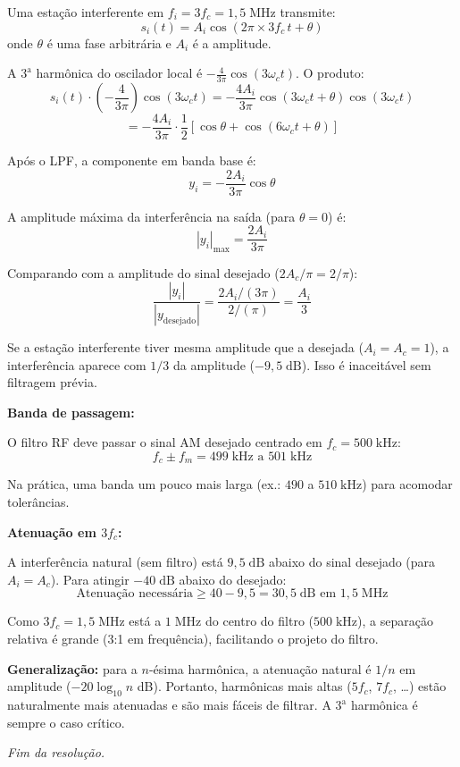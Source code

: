 \documentclass[11pt,a4paper]{article}
\begin{document}
\begin{resolucao}

Uma estação interferente em $f_i = 3f_c = 1{,}5\;\text{MHz}$ transmite:
\[
  s_i(t) = A_i\cos(2\pi \times 3f_c\,t + \theta)
\]
onde $\theta$ é uma fase arbitrária e $A_i$ é a amplitude.

A $3^{\text{a}}$ harmônica do oscilador local é $-\frac{4}{3\pi}\cos(3\omega_c t)$. O produto:
\[
  s_i(t) \cdot \left(-\frac{4}{3\pi}\right)\cos(3\omega_c t) = -\frac{4A_i}{3\pi}\cos(3\omega_c t + \theta)\cos(3\omega_c t)
\]
\[
  = -\frac{4A_i}{3\pi} \cdot \frac{1}{2}[\cos\theta + \cos(6\omega_c t + \theta)]
\]

Após o LPF, a componente em banda base é:
\[
  y_i = -\frac{2A_i}{3\pi}\cos\theta
\]

A amplitude máxima da interferência na saída (para $\theta = 0$) é:
\[
  |y_i|_{\max} = \frac{2A_i}{3\pi}
\]

Comparando com a amplitude do sinal desejado ($2A_c/\pi = 2/\pi$):
\[
  \boxed{\frac{|y_i|}{|y_{\text{desejado}}|} = \frac{2A_i/(3\pi)}{2/({\pi})} = \frac{A_i}{3}}
\]

Se a estação interferente tiver mesma amplitude que a desejada ($A_i = A_c = 1$), a interferência aparece com $1/3$ da amplitude ($-9{,}5\;\text{dB}$). Isso é inaceitável sem filtragem prévia.
\end{resolucao}

\begin{resolucao}

\textbf{Banda de passagem:}

O filtro RF deve passar o sinal AM desejado centrado em $f_c = 500\;\text{kHz}$:
\[
  \boxed{f_c \pm f_m = 499\;\text{kHz a } 501\;\text{kHz}}
\]

Na prática, uma banda um pouco mais larga (ex.: $490$ a $510\;\text{kHz}$) para acomodar tolerâncias.

\textbf{Atenuação em $3f_c$:}

A interferência natural (sem filtro) está $9{,}5\;\text{dB}$ abaixo do sinal desejado (para $A_i = A_c$). Para atingir $-40\;\text{dB}$ abaixo do desejado:
\[
  \text{Atenuação necessária} \geq 40 - 9{,}5 = \boxed{30{,}5\;\text{dB em } 1{,}5\;\text{MHz}}
\]

Como $3f_c = 1{,}5\;\text{MHz}$ está a $1\;\text{MHz}$ do centro do filtro ($500\;\text{kHz}$), a separação relativa é grande (3:1 em frequência), facilitando o projeto do filtro.

\textbf{Generalização:} para a $n$-ésima harmônica, a atenuação natural é $1/n$ em amplitude ($-20\log_{10} n$ dB). Portanto, harmônicas mais altas ($5f_c$, $7f_c$, \ldots) estão naturalmente mais atenuadas e são mais fáceis de filtrar. A $3^{\text{a}}$ harmônica é sempre o caso crítico.
\end{resolucao}

\vfill
\begin{center}
  \small\textit{Fim da resolução.}
\end{center}
\end{document}
